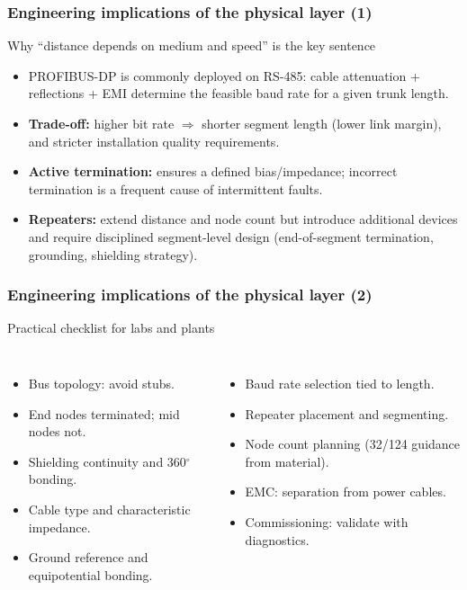 \begin{frame}
	\frametitle{Engineering implications of the physical layer (1)}
	\justifying
	\begin{block}{Why ``distance depends on medium and speed'' is the key sentence}
		\begin{itemize}
			\item PROFIBUS-DP is commonly deployed on RS-485: cable attenuation + reflections + EMI determine the feasible baud rate for a given trunk length.
			\item \textbf{Trade-off:} higher bit rate $\Rightarrow$ shorter segment length (lower link margin), and stricter installation quality requirements.
			\item \textbf{Active termination:} ensures a defined bias/impedance; incorrect termination is a frequent cause of intermittent faults.
			\item \textbf{Repeaters:} extend distance and node count but introduce additional devices and require disciplined segment-level design (end-of-segment termination, grounding, shielding strategy).
		\end{itemize}
	\end{block}
\end{frame}

\begin{frame}
	\frametitle{Engineering implications of the physical layer (2)}
	\justifying
	\begin{block}{Practical checklist for labs and plants}
		\begin{columns}[T,totalwidth=\textwidth]
				\begin{itemize}
					\item Bus topology: avoid stubs.
					\item End nodes terminated; mid nodes not.
					\item Shielding continuity and 360$^\circ$ bonding.
					\item Cable type and characteristic impedance.
					\item Ground reference and equipotential bonding.
				\end{itemize}
				\begin{itemize}
					\item Baud rate selection tied to length.
					\item Repeater placement and segmenting.
					\item Node count planning (32/124 guidance from material).
					\item EMC: separation from power cables.
					\item Commissioning: validate with diagnostics.
				\end{itemize}
		\end{columns}
	\end{block}
\end{frame}

